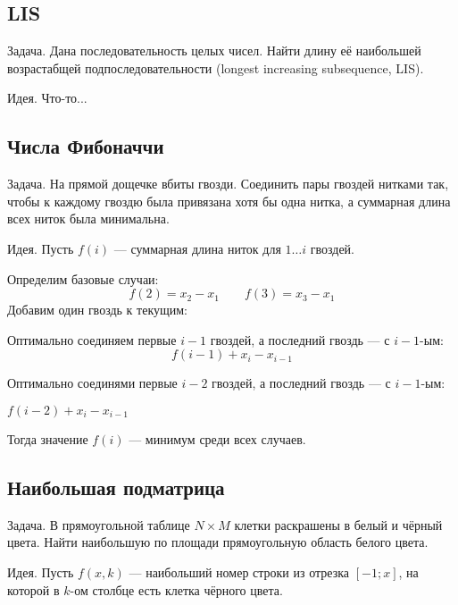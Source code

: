 \subsection{LIS}

\begin{theorem}
{\bold Задача.} Дана последовательность целых чисел. Найти длину её наибольшей возрастабщей подпоследовательности {\ital\color{desc}(longest increasing subsequence, LIS)}.
\end{theorem}

{\bold Идея.} Что-то...

\subsection{Числа Фибоначчи}

\begin{theorem}
{\bold Задача.} На прямой дощечке вбиты гвозди. Соединить пары гвоздей нитками так, чтобы к каждому гвоздю была привязана хотя бы одна нитка, а суммарная длина всех ниток была минимальна. 
\end{theorem}

{\bold Идея.} Пусть $f(i)$ --- суммарная длина ниток для $1\dots i$ гвоздей.

Определим базовые случаи:
$$f(2)=x_2-x_1\qquad f(3)=x_3-x_1$$
Добавим один гвоздь к текущим:
\begin{list*}[][\#]
\item Оптимально соединяем первые $i-1$ гвоздей, а последний гвоздь --- с $i-1$-ым:
$$f(i-1)+x_i-x_{i-1}$$
\item Оптимально соединями первые $i-2$ гвоздей, а последний гвоздь --- с $i-1$-ым:

{\centering $f(i-2)+x_i-x_{i-1}$\par}
\end{list*}
Тогда значение $f(i)$ --- {\ital минимум} среди всех случаев.

\subsection{Наибольшая подматрица}

\begin{theorem}
{\bold Задача.} В прямоугольной таблице $N\times M$ клетки раскрашены в белый и чёрный цвета. Найти наибольшую по площади прямоугольную область белого цвета.
\end{theorem}

{\bold Идея.} Пусть $f(x,k)$ --- наибольший номер строки из отрезка $[-1;x]$, на которой в $k$-ом столбце есть клетка {\ital чёрного} цвета.

